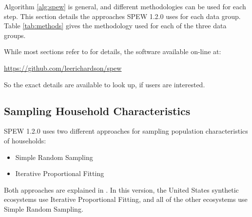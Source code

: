 \documentclass[font=9pt]{article}
\begin{document}
Algorithm \ref{alg:spew} is general, and different methodologies can be used for each step. This section details the approaches SPEW 1.2.0 uses for each data group. Table \ref{tab:methods} gives the methodology used for each of the three data groups. 

\begin{table}[ht]
  \centering 
  \caption{Methodologies used for the three data groups. \vspace{2em}}
  \label{tab:methods}
\end{table}

While most sections refer to \cite{spew} for details, the software available on-line at:

\vspace{2mm}
	\url{https://github.com/leerichardson/spew}
\vspace{2mm}

So the exact details are available to look up, if users are interested. 


\subsection{Sampling Household Characteristics}
SPEW 1.2.0 uses two different approaches for sampling population characteristics of households:

\begin{itemize}
	\item Simple Random Sampling
	\item Iterative Proportional Fitting
\end{itemize}

Both approaches are explained in \cite{spew}. In this version, the United States synthetic ecosystems use Iterative Proportional Fitting, and all of the other ecosystems use Simple Random Sampling. 

\subsubsection{}
\end{document}
